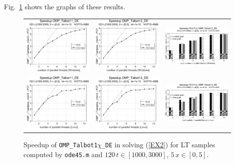 \documentclass[a4paper,10pt]{report}%
\begin{document}
Fig.~\ref{PAR_EX2_speedup_ode45} shows the graphs of these results.
\begin{figure}[htb]
\centering
\begin{tabular}{ccc} %
\includegraphics[height=0.2\textwidth]{./FIGS/EX2/EX2_ode45_speedup_11_Windows.eps} &
\includegraphics[height=0.2\textwidth]{./FIGS/EX2/EX2_ode45_speedup_12_Windows.eps} &
\includegraphics[height=0.2\textwidth,keepaspectratio=true]{./FIGS/EX2/EX2_ode45_speedup_13_Windows.eps} \\
\includegraphics[height=0.2\textwidth]{./FIGS/EX2/EX2_ode45_speedup_11_Linux.eps} &
\includegraphics[height=0.2\textwidth]{./FIGS/EX2/EX2_ode45_speedup_12_Linux.eps} &
\includegraphics[height=0.2\textwidth,keepaspectratio=true]{./FIGS/EX2/EX2_ode45_speedup_13_Linux.eps}
\end{tabular}
\caption{\small Speedup of {\tt OMP\_Talbot1$\chi$\_DE} in solving (\ref{EX2}) for LT samples computed
by {\tt ode45.m} and $120\,t\in[1000,3000]$, $5\,x\in[0,5]$.}
\label{PAR_EX2_speedup_ode45}
\end{figure}
\end{document}
